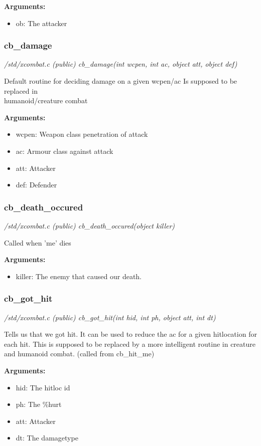 {\bf Arguments:}
\begin{itemize}
\item      ob: The attacker
\end{itemize}


\subsubsection{cb\_damage}

{\em /std/xcombat.c (public) cb\_damage(int wcpen, int ac, object att, object def)}

Default routine for deciding damage on a given wcpen/ac
Is supposed to be replaced in \\ humanoid/creature combat

{\bf Arguments:}
\begin{itemize}
\item     wcpen:    Weapon class penetration of attack
\item ac:       Armour class against attack
\item att:      Attacker
\item def:      Defender
\end{itemize}


\subsubsection{cb\_death\_occured}

{\em /std/xcombat.c (public) cb\_death\_occured(object killer)}

Called when 'me' dies

{\bf Arguments:}
\begin{itemize}
\item      killer: The enemy that caused our death.
\end{itemize}


\subsubsection{cb\_got\_hit}

{\em /std/xcombat.c (public) cb\_got\_hit(int hid, int ph, object att, int dt)}

Tells us that we got hit. It can be used to reduce the ac
for a given hitlocation for each hit. This is supposed to be
replaced by a more intelligent routine in creature and
humanoid combat. (called from cb\_hit\_me)

{\bf Arguments:}
\begin{itemize}
\item      hid:   The hitloc id
\item ph:    The \%hurt
\item att:   Attacker
\item dt:    The damagetype
\end{itemize}


